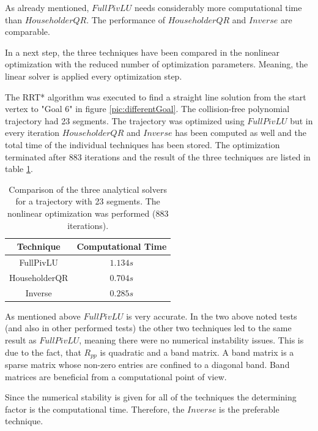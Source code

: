 As already mentioned, $FullPivLU$ needs considerably more computational time than $HouseholderQR$. The performance of $HouseholderQR$ and $Inverse$ are comparable.\newline

In a next step, the three techniques have been compared in the nonlinear optimization with the reduced number of optimization parameters. Meaning, the linear solver is applied every optimization step.  \newline

The RRT* algorithm was executed to find a straight line solution from the start vertex to "Goal 6" in figure \ref{pic:differentGoal}. The collision-free polynomial trajectory had 23 segments. The trajectory was optimized using $FullPivLU$ but in every iteration $HouseholderQR$ and $Inverse$ has been computed as well and the total time of the individual techniques has been stored. The optimization terminated after 883 iterations and the result of the three techniques are listed in table \ref{tab:883iter}.\newline


\begin{table}[h] 
\begin{center}
    \begin{tabular}{| c | c | }
    \hline
    Technique & Computational Time  \\ \hline
  FullPivLU  & $1.134s$\\ \hline
  HouseholderQR & $0.704s$\\ \hline
 Inverse & $0.285s$\\
    \hline
    \end{tabular}
    \caption{Comparison of the three analytical solvers for a trajectory with 23 segments. The nonlinear optimization was performed (883 iterations).}
    \label{tab:883iter}
\end{center}
\end{table}


As mentioned above $FullPivLU$ is very accurate. In the two above noted tests (and also in other performed tests) the other two techniques led to the same result as $FullPivLU$, meaning there were no numerical instability issues. This is due to the fact, that $R_{pp}$ is quadratic and a band matrix. A band matrix is a sparse matrix whose non-zero entries are confined to a diagonal band. Band matrices are beneficial from a computational point of view.


Since the numerical stability is given for all of the techniques the determining factor is the computational time. Therefore, the $Inverse$ is the preferable technique. \newline

